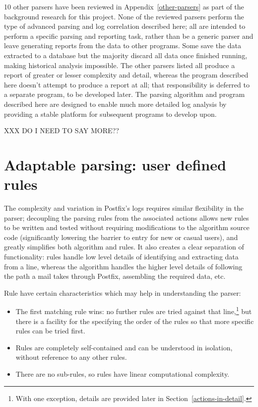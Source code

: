 \documentclass[a4paper,12pt,draft]{article}
\begin{document}
10 other parsers have been reviewed in Appendix~\ref{other-parsers} as part
of the background research for this project.  None of the reviewed parsers
perform the type of advanced parsing and log correlation described here;
all are intended to perform a specific parsing and reporting task, rather
than be a generic parser and leave generating reports from the data to
other programs.  Some save the data extracted to a database but the
majority discard all data once finished running, making historical analysis
impossible.  The other parsers listed all produce a report of greater or
lesser complexity and detail, whereas the program described here doesn't
attempt to produce a report at all; that responsibility is deferred to a
separate program, to be developed later.  The parsing algorithm and program
described here are designed to enable much more detailed log analysis by
providing a stable platform for subsequent programs to develop upon.

XXX DO I NEED TO SAY MORE??


\section{Adaptable parsing: user defined rules}

\label{rules}

The complexity and variation in Postfix's logs requires similar flexibility
in the parser; decoupling the parsing rules from the associated actions
allows new rules to be written and tested without requiring modifications
to the algorithm source code (significantly lowering the barrier to entry
for new or casual users), and greatly simplifies both algorithm and rules.
It also creates a clear separation of functionality: rules handle low level
details of identifying and extracting data from a line, whereas the
algorithm handles the higher level details of following the path a mail
takes through Postfix, assembling the required data, etc.

Rule have certain characteristics which may help in understanding the
parser:

\begin{itemize}

    \item The first matching rule wins: no further rules are tried against
        that line,\footnote{With one exception, details are provided later
        in Section~\ref{actions-in-detail}.} but there is a facility for
        the specifying the order of the rules so that more specific rules
        can be tried first.

    \item Rules are completely self-contained and can be understood in
        isolation, without reference to any other rules.

    \item There are no sub-rules, so rules have linear computational
        complexity.

\end{itemize}
\end{document}
